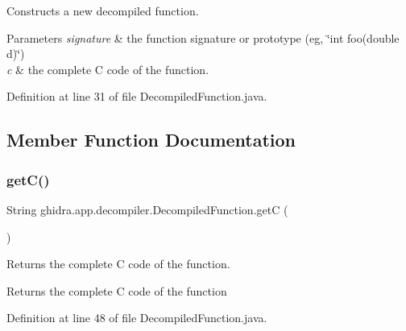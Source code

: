 Constructs a new decompiled function. 
\begin{DoxyParams}{Parameters}
{\em signature} & the function signature or prototype (eg, \char`\"{}int foo(double d)\char`\"{}) \\
\hline
{\em c} & the complete C code of the function. \\
\hline
\end{DoxyParams}


Definition at line 31 of file Decompiled\+Function.\+java.



\subsection{Member Function Documentation}
\mbox{\label{classghidra_1_1app_1_1decompiler_1_1_decompiled_function_a43056f99e19bc160c0fb94c2b7e26049}} 
\subsubsection{\texorpdfstring{getC()}{getC()}}
{\footnotesize\ttfamily String ghidra.\+app.\+decompiler.\+Decompiled\+Function.\+getC (\begin{DoxyParamCaption}{ }\end{DoxyParamCaption})\hspace{0.3cm}{\ttfamily [inline]}}

Returns the complete C code of the function. \begin{DoxyReturn}{Returns}
the complete C code of the function 
\end{DoxyReturn}


Definition at line 48 of file Decompiled\+Function.\+java.

